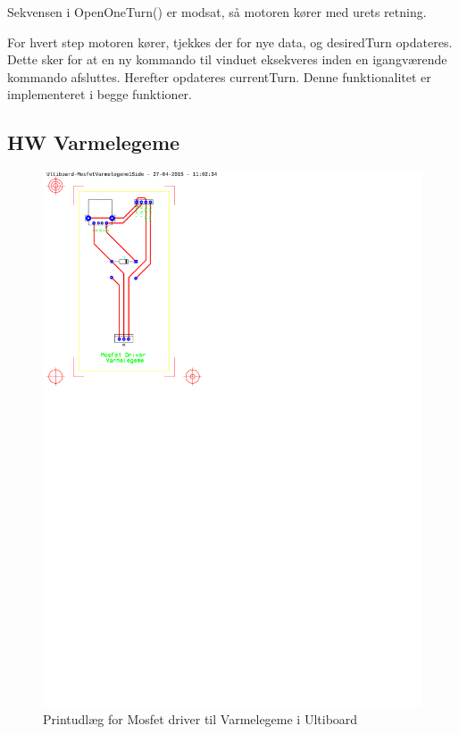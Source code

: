 Sekvensen i OpenOneTurn() er modsat, så motoren kører med urets retning. 

For hvert step motoren kører, tjekkes der for nye data, og desiredTurn opdateres. Dette sker for at en ny kommando til vinduet eksekveres inden en igangværende kommando afsluttes. Herefter opdateres currentTurn. Denne funktionalitet er implementeret i begge funktioner.

\clearpage

\subsection{HW Varmelegeme}

\begin{figure}[h]
\centering 
\includegraphics[width={\textwidth-8cm}, trim=50 520 390 30, clip=true, angle =90] {../fig/ultiboard_varmelegeme.pdf}
\caption{Printudlæg for Mosfet driver til Varmelegeme i Ultiboard}
\label{fig:ultiboard_varmelegeme}
\end{figure}

